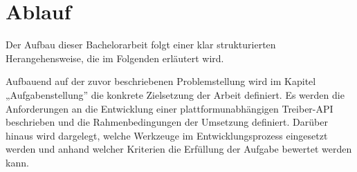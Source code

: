 %
% 
%


\section{Ablauf}
Der Aufbau dieser Bachelorarbeit folgt einer klar strukturierten Herangehensweise, die im Folgenden erläutert wird. 

Aufbauend auf der zuvor beschriebenen Problemstellung wird im Kapitel „Aufgabenstellung” die konkrete Zielsetzung der Arbeit definiert.
Es werden die Anforderungen an die Entwicklung einer plattformunabhängigen Treiber-API beschrieben und die Rahmenbedingungen der Umsetzung definiert.
Darüber hinaus wird dargelegt, welche Werkzeuge im Entwicklungsprozess eingesetzt werden und anhand welcher Kriterien die Erfüllung der Aufgabe bewertet werden kann.

